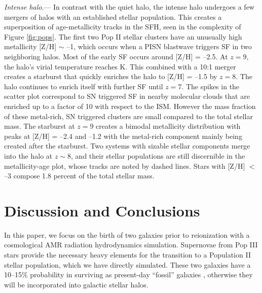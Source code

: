 \documentclass[apjl]{emulateapj}
\begin{document}
\textit{Intense halo}.--- In contrast with the quiet halo, the intense
halo undergoes a few mergers of halos with an established stellar
population.  This creates a superposition of age-metallicity tracks in
the SFH, seen in the complexity of Figure \ref{fig:pops}.  The first
two Pop II stellar clusters have an unusually high metallicity [Z/H]
$\sim$ --1, which occurs when a PISN blastwave triggers SF in two
neighboring halos.  Most of the early SF occurs around [Z/H] = --2.5.
At $z=9$, the halo's virial temperature reaches  K.  This
combined with a 10:1 merger creates a starburst that quickly enriches
the halo to [Z/H] = --1.5 by $z=8$.  The halo continues to enrich
itself with further SF until $z=7$.  The spikes in the scatter plot
correspond to SN triggered SF in nearby molecular clouds
that are enriched up to a factor of 10 with respect to the ISM.
However the mass fraction of these metal-rich, SN triggered clusters
are small compared to the total stellar mass.  The starburst at $z=9$
creates a bimodal metallicity distribution with peaks at [Z/H] = --2.4
and --1.2 with the metal-rich component mainly being created after the
starburst.  Two systems with sizable stellar components merge into the
halo at $z \sim 8$, and their stellar populations are still
discernible in the metallicity-age plot, whose tracks are noted by
dashed lines.  Stars with [Z/H] $<$ --3 compose 1.8 percent of the
total stellar mass.

\section{Discussion and Conclusions}

In this paper, we focus on the birth of two galaxies prior to
reionization with a cosmological AMR radiation hydrodynamics
simulation.  Supernovae from Pop III stars provide the necessary heavy
elements for the transition to a Population II stellar population,
which we have directly simulated.  These two galaxies have a 10--15\%
probability in surviving as present-day ``fossil'' galaxies
\citep{Gnedin06}, otherwise they will be incorporated into galactic
stellar halos.  
\end{document}
